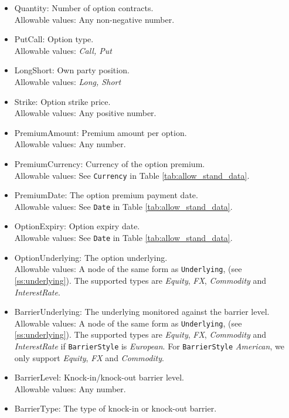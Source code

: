 \begin{itemize} 
  \item Quantity: Number of option contracts. \\
  Allowable values: Any non-negative number.
  \item PutCall: Option type. \\
  Allowable values: \emph{Call, Put}
  \item LongShort: Own party position. \\
  Allowable values: \emph{Long, Short}
  \item Strike: Option strike price. \\
  Allowable values: Any positive number.
  \item PremiumAmount: Premium amount per option. \\
  Allowable values: Any number.
  \item PremiumCurrency: Currency of the option premium. \\
  Allowable values: See \lstinline!Currency! in Table \ref{tab:allow_stand_data}.
  \item PremiumDate: The option premium payment date. \\
  Allowable values: See \lstinline!Date! in Table \ref{tab:allow_stand_data}.
  \item OptionExpiry: Option expiry date. \\
  Allowable values: See \lstinline!Date! in Table \ref{tab:allow_stand_data}.
  \item OptionUnderlying: The option underlying. \\
  Allowable values: A node of the same form as \lstinline!Underlying!, (see \ref{ss:underlying}). The supported types
  are \emph{Equity}, \emph{FX}, \emph{Commodity} and \emph{InterestRate}. \\
  \item BarrierUnderlying: The underlying monitored against the barrier level. \\
  Allowable values: A node of the same form as \lstinline!Underlying!, (see \ref{ss:underlying}). The supported types
  are \emph{Equity}, \emph{FX}, \emph{Commodity} and \emph{InterestRate} if \lstinline!BarrierStyle! is \emph{European}. For \lstinline!BarrierStyle!
  \emph{American}, we only support \emph{Equity}, \emph{FX} and \emph{Commodity}.
  \item BarrierLevel: Knock-in/knock-out barrier level. \\
  Allowable values: Any number.
  \item BarrierType: The type of knock-in or knock-out barrier. \\

\end{itemize}
